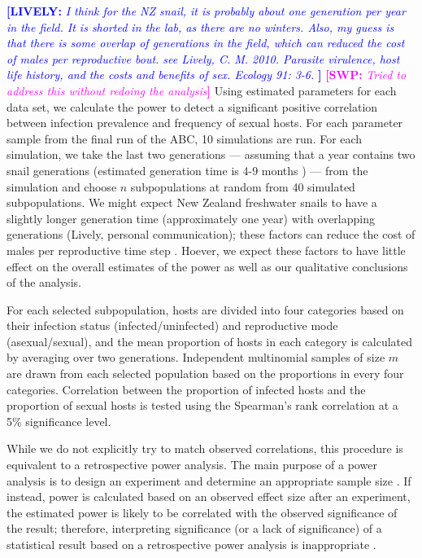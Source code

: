\documentclass{article}\usepackage[]{graphicx}\usepackage[]{color}
\newcommand{\comment}[3]{\textcolor{#1}{\textbf{[#2: }\textit{#3}\textbf{]}}}
\newcommand{\swp}[1]{\comment{magenta}{SWP}{#1}}
\newcommand{\lively}[1]{\comment{blue}{LIVELY}{#1}}
\begin{document}
\lively{
I think for the NZ snail, it is probably about one generation per year in the field.  It is shorted in the lab, as there are no winters.  Also, my guess is that there is some overlap of generations in the field, which can reduced the cost of males per reproductive bout.  see Lively, C. M.  2010.  Parasite virulence, host life history, and the costs and benefits of sex.  Ecology 91: 3-6.
}
\swp{Tried to address this without redoing the analysis}
Using estimated parameters for each data set, we calculate the power to detect a significant positive correlation between infection prevalence and frequency of sexual hosts.
For each parameter sample from the final run of the ABC, 10 simulations are run.
For each simulation, we take the last two generations --- assuming that a year contains two snail generations (estimated generation time is 4-9 months \citep{neiman2005variation}) --- from the simulation and choose $n$ subpopulations at random from 40 simulated subpopulations.
We might expect New Zealand freshwater snails to have a slightly longer generation 
time (approximately one year) with overlapping generations (Lively, personal communication);
these factors can reduce the cost of males per reproductive time step \citep{lively2010parasite}.
Hoever, we expect these factors to have little effect on the overall estimates of the power
as well as our qualitative conclusions of the analysis.

For each selected subpopulation, hosts are divided into four categories based on their infection status (infected/uninfected) and reproductive mode (asexual/sexual),
and the mean proportion of hosts in each category is calculated by averaging over two generations.
Independent multinomial samples of size $m$ are drawn from each selected population based on the proportions in every four categories. 
Correlation between the proportion of infected hosts and the proportion of sexual hosts is tested using the Spearman's rank correlation at a 5\% significance level.

While we do not explicitly try to match observed correlations, this procedure is equivalent to a retrospective power analysis.
The main purpose of a power analysis is to design an experiment and determine an appropriate sample size \citep{cohen1992statistical}.
If instead, power is calculated based on an observed effect size after an experiment, the estimated power is likely to be correlated with the observed significance of the result;
therefore, interpreting significance (or a lack of significance) of a statistical result based on a retrospective power analysis is inappropriate \citep{goodman1994use, senn2002power}.
\end{document}
